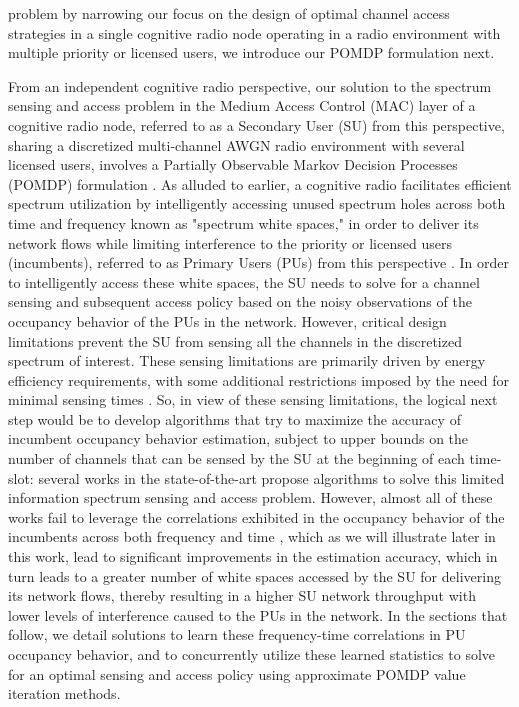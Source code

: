 \documentclass[12pt, draftcls, onecolumn]{IEEEtran}
\begin{document}
problem by narrowing our focus on the design of optimal channel access strategies in a single cognitive radio node operating in a radio environment with multiple priority or licensed users, we introduce our POMDP formulation next.

From an independent cognitive radio perspective, our solution to the spectrum sensing and access problem in the Medium Access Control (MAC) layer of a cognitive radio node, referred to as a Secondary User (SU) from this perspective, sharing a discretized multi-channel AWGN radio environment with several licensed users, involves a Partially Observable Markov Decision Processes (POMDP) formulation \cite{WCL:paper}. As alluded to earlier, a cognitive radio facilitates efficient spectrum utilization by intelligently accessing unused spectrum holes across both time and frequency known as "spectrum white spaces," in order to deliver its network flows while limiting interference to the priority or licensed users (incumbents), referred to as Primary Users (PUs) from this perspective \cite{WCL:2}. In order to intelligently access these white spaces, the SU needs to solve for a channel sensing and subsequent access policy based on the noisy observations of the occupancy behavior of the PUs in the network. However, critical design limitations prevent the SU from sensing all the channels in the discretized spectrum of interest. These sensing limitations are primarily driven by energy efficiency requirements, with some additional restrictions imposed by the need for minimal sensing times \cite{WCL:3}. So, in view of these sensing limitations, the logical next step would be to develop algorithms that try to maximize the accuracy of incumbent occupancy behavior estimation, subject to upper bounds on the number of channels that can be sensed by the SU at the beginning of each time-slot: several works in the state-of-the-art \cite{WCL:4,WCL:5,WCL:6,WCL:7} propose algorithms to solve this limited information spectrum sensing and access problem. However, almost all of these works \cite{WCL:4,WCL:5,WCL:8,WCL:9,WCL:10,WCL:11} fail to leverage the correlations exhibited in the occupancy behavior of the incumbents across both frequency and time \cite{WCL:12}, which as we will illustrate later in this work, lead to significant improvements in the estimation accuracy, which in turn leads to a greater number of white spaces accessed by the SU for delivering its network flows, thereby resulting in a higher SU network throughput with lower levels of interference caused to the PUs in the network. In the sections that follow, we detail solutions to learn these frequency-time correlations in PU occupancy behavior, and to concurrently utilize these learned statistics to solve for an optimal sensing and access policy using approximate POMDP value iteration methods.
\end{document}
